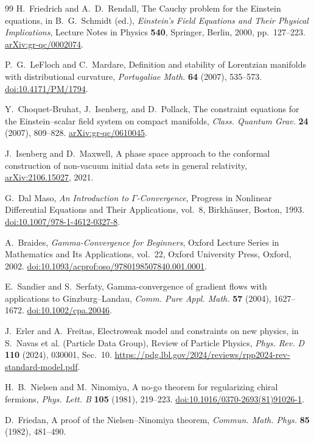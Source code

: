 \documentclass[11pt]{article}
\numberwithin{equation}{section}
\theoremstyle{definition}
\theoremstyle{remark}
\begin{document}
\begin{thebibliography}{99}
H.~Friedrich and A.~D.~Rendall,
The Cauchy problem for the Einstein equations,
in B.~G.~Schmidt (ed.), \emph{Einstein's Field Equations and Their Physical Implications},
Lecture Notes in Physics \textbf{540}, Springer, Berlin, 2000, pp.~127--223.
\href{https://arxiv.org/abs/gr-qc/0002074}{arXiv:gr-qc/0002074}.

P.~G.~LeFloch and C.~Mardare,
Definition and stability of Lorentzian manifolds with distributional curvature,
\emph{Portugaliae Math.} \textbf{64} (2007), 535--573.
\href{https://doi.org/10.4171/PM/1794}{doi:10.4171/PM/1794}.

Y.~Choquet-Bruhat, J.~Isenberg, and D.~Pollack,
The constraint equations for the Einstein--scalar field system on compact manifolds,
\emph{Class. Quantum Grav.} \textbf{24} (2007), 809--828.
\href{https://arxiv.org/abs/gr-qc/0610045}{arXiv:gr-qc/0610045}.

J.~Isenberg and D.~Maxwell,
A phase space approach to the conformal construction of non-vacuum initial data sets in general relativity,
\href{https://arxiv.org/abs/2106.15027}{arXiv:2106.15027}, 2021.

G.~Dal Maso,
\emph{An Introduction to $\Gamma$-Convergence},
Progress in Nonlinear Differential Equations and Their Applications,
vol.~8, Birkh\"auser, Boston, 1993.
\href{https://doi.org/10.1007/978-1-4612-0327-8}{doi:10.1007/978-1-4612-0327-8}.

A.~Braides,
\emph{Gamma-Convergence for Beginners},
Oxford Lecture Series in Mathematics and Its Applications, vol.~22,
Oxford University Press, Oxford, 2002.
\href{https://doi.org/10.1093/acprof:oso/9780198507840.001.0001}{doi:10.1093/acprof:oso/9780198507840.001.0001}.

E.~Sandier and S.~Serfaty,
Gamma-convergence of gradient flows with applications to Ginzburg--Landau,
\emph{Comm. Pure Appl. Math.} \textbf{57} (2004), 1627--1672.
\href{https://doi.org/10.1002/cpa.20046}{doi:10.1002/cpa.20046}.

J.~Erler and A.~Freitas,
Electroweak model and constraints on new physics,
in S.~Navas et al. (Particle Data Group), Review of Particle Physics,
\emph{Phys. Rev. D} \textbf{110} (2024), 030001, Sec.~10.
\url{https://pdg.lbl.gov/2024/reviews/rpp2024-rev-standard-model.pdf}.

H.~B.~Nielsen and M.~Ninomiya,
A no-go theorem for regularizing chiral fermions,
\emph{Phys. Lett. B} \textbf{105} (1981), 219--223.
\href{https://doi.org/10.1016/0370-2693(81)91026-1}{doi:10.1016/0370-2693(81)91026-1}.

D.~Friedan,
A proof of the Nielsen--Ninomiya theorem,
\emph{Commun. Math. Phys.} \textbf{85} (1982), 481--490.

\end{thebibliography}
\end{document}
